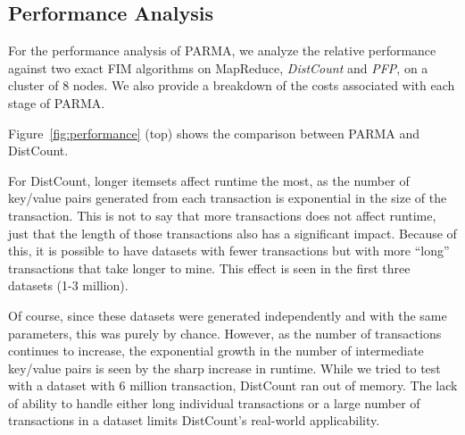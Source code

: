 \subsection{Performance Analysis} 

For the performance analysis of PARMA, we analyze the relative
performance against two exact FIM algorithms on MapReduce,
\emph{DistCount} and \emph{PFP}, on a cluster of 8 nodes. We also provide a breakdown of the costs
associated with each stage of PARMA.


Figure~\ref{fig:performance} (top) shows the comparison
between PARMA and DistCount.

For DistCount,
longer itemsets affect runtime the most, as
the number of key/value pairs generated from each transaction is
exponential in the size of the transaction. This is not to say that more
transactions does not affect runtime, just that the length of those
transactions also has a significant impact. Because of this, it is
possible to have datasets with fewer transactions but with more ``long''
transactions that take longer to mine. This effect is seen in the first
three datasets (1-3 million). 

Of course, since these datasets
were generated independently and with the same parameters,
this was purely by chance. However, as the number of transactions continues to
increase, the exponential growth in the number of intermediate key/value
pairs is seen by the sharp increase in runtime. While we tried to test
with a dataset with 6 million transaction, DistCount ran out of memory.
The lack of ability to handle either long individual transactions or a
large number of transactions in a dataset limits DistCount's
real-world applicability. 

